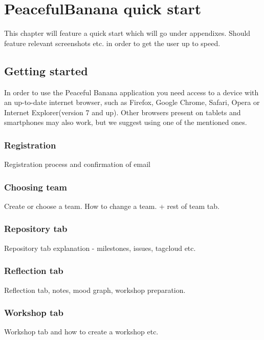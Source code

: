\chapter*{PeacefulBanana quick start}
This chapter will feature a quick start which will go under appendixes. 
Should feature relevant screenshots etc. in order to get the user up to speed. 

\section*{Getting started}
In order to use the Peaceful Banana application you need access to a device with an up-to-date internet browser, such as Firefox, Google Chrome, Safari, Opera or Internet Explorer(version 7 and up). Other browsers present on tablets and smartphones may also work, but we suggest using one of the mentioned ones. 

\subsection*{Registration}
Registration process and confirmation of email
\subsection*{Choosing team}
Create or choose a team. How to change a team. + rest of team tab. 
\subsection*{Repository tab}
Repository tab explanation - milestones, issues, tagcloud etc.
\subsection*{Reflection tab}
Reflection tab, notes, mood graph, workshop preparation.
\subsection*{Workshop tab}
Workshop tab and how to create a workshop etc. 